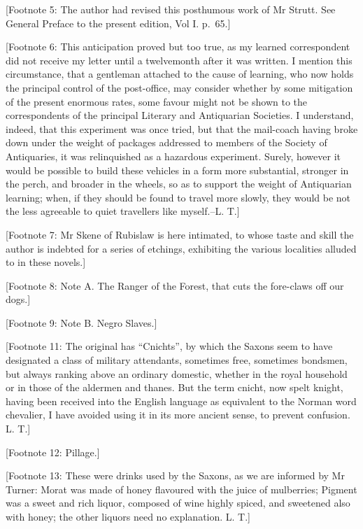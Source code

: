 {[}Footnote 5: The author had revised this posthumous work of Mr Strutt.
See General Preface to the present edition, Vol I. p.~65.{]}

{[}Footnote 6: This anticipation proved but too true, as my learned
correspondent did not receive my letter until a twelvemonth after it was
written. I mention this circumstance, that a gentleman attached to the
cause of learning, who now holds the principal control of the
post-office, may consider whether by some mitigation of the present
enormous rates, some favour might not be shown to the correspondents of
the principal Literary and Antiquarian Societies. I understand, indeed,
that this experiment was once tried, but that the mail-coach having
broke down under the weight of packages addressed to members of the
Society of Antiquaries, it was relinquished as a hazardous experiment.
Surely, however it would be possible to build these vehicles in a form
more substantial, stronger in the perch, and broader in the wheels, so
as to support the weight of Antiquarian learning; when, if they should
be found to travel more slowly, they would be not the less agreeable to
quiet travellers like myself.--L. T.{]}

{[}Footnote 7: Mr Skene of Rubislaw is here intimated, to whose taste
and skill the author is indebted for a series of etchings, exhibiting
the various localities alluded to in these novels.{]}

{[}Footnote 8: Note A. The Ranger of the Forest, that cuts the
fore-claws off our dogs.{]}

{[}Footnote 9: Note B. Negro Slaves.{]}

{[}Footnote 11: The original has ``Cnichts'', by which the Saxons seem
to have designated a class of military attendants, sometimes free,
sometimes bondsmen, but always ranking above an ordinary domestic,
whether in the royal household or in those of the aldermen and thanes.
But the term cnicht, now spelt knight, having been received into the
English language as equivalent to the Norman word chevalier, I have
avoided using it in its more ancient sense, to prevent confusion. L.
T.{]}

{[}Footnote 12: Pillage.{]}

{[}Footnote 13: These were drinks used by the Saxons, as we are informed
by Mr Turner: Morat was made of honey flavoured with the juice of
mulberries; Pigment was a sweet and rich liquor, composed of wine highly
spiced, and sweetened also with honey; the other liquors need no
explanation. L. T.{]}

